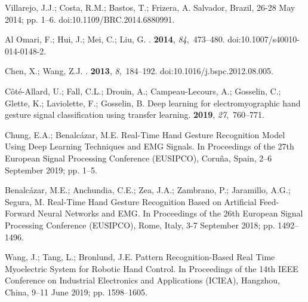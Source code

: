 \documentclass[sensors,review,accept,moreauthors,pdftex]{Definitions/mdpi}
\begin{document}
\begin{thebibliography}{999}
Villarejo, J.J.; Costa, R.M.; Bastos, T.; Frizera, A.
 Salvador, Brazil, 26-28 May 2014;
\newblock pp. 1--6. doi:10.1109/BRC.2014.6880991.

{Al Omari}, F.; Hui, J.; Mei, C.; Liu, G.
.
 {\bf 2014}, {\em 84},~473--480. doi:10.1007/s40010-014-0148-2.

Chen, X.; Wang, Z.J.
.
 {\bf 2013}, {\em
  8},~184--192. doi:10.1016/j.bspc.2012.08.005.

C{\^o}t{\'e}-Allard, U.; Fall, C.L.; Drouin, A.; Campeau-Lecours, A.; Gosselin,
  C.; Glette, K.; Laviolette, F.; Gosselin, B.
\newblock Deep learning for electromyographic hand gesture signal
  classification using transfer learning.
 {\bf 2019}, {\em 27},~760--771.

Chung, E.A.; Benalc{\'a}zar, M.E.
\newblock Real-Time Hand Gesture Recognition Model Using Deep Learning
  Techniques and EMG Signals.
In {Proceedings of the 27th European Signal Processing Conference (EUSIPCO),} Coruña, Spain, 2--6 September 2019; pp. 1--5.

Benalc{\'a}zar, M.E.; Anchundia, C.E.; Zea, J.A.; Zambrano, P.; Jaramillo,
  A.G.; Segura, M.
\newblock Real-Time Hand Gesture Recognition Based on Artificial Feed-Forward
  Neural Networks and EMG.
In {Proceedings of the 26th European Signal Processing Conference (EUSIPCO),} Rome, Italy, 3-7 September 2018; pp. 1492--1496.

Wang, J.; Tang, L.; Bronlund, J.E.
\newblock Pattern Recognition-Based Real Time Myoelectric System for Robotic
  Hand Control.
In {Proceedings of the 14th IEEE Conference on Industrial Electronics and Applications (ICIEA),} Hangzhou, China, 9--11 June 2019; pp. 1598--1605.


\end{thebibliography}
\end{document}

